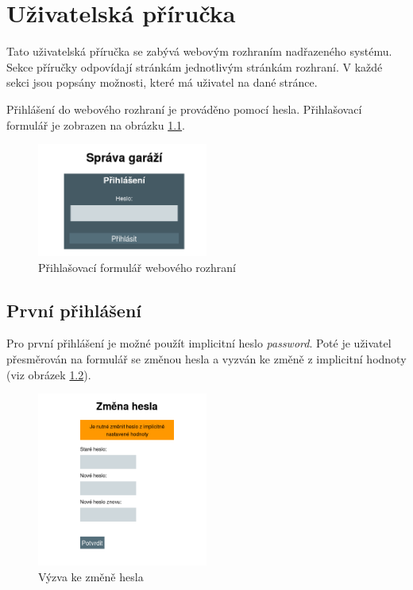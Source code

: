 \chapter{Uživatelská příručka}
\label{sec:guide}

Tato uživatelská příručka se zabývá webovým rozhraním nadřazeného systému. Sekce příručky odpovídají stránkám jednotlivým stránkám rozhraní. V každé sekci jsou popsány možnosti, které má uživatel na dané stránce.

Přihlášení do webového rozhraní je prováděno pomocí hesla. Přihlašovací formulář je zobrazen na obrázku \ref{fig:login}.

\begin{figure}[h!]
    \centering
    \includegraphics[width=0.5\textwidth]{images/login.png}
    \caption[Přihlašovací formulář webového rozhraní]{Přihlašovací formulář webového rozhraní}
    \label{fig:login}
\end{figure}

\section{První přihlášení}

Pro první přihlášení je možné použít implicitní heslo \textit{password}. Poté je uživatel přesměrován na formulář se změnou hesla a vyzván ke změně z implicitní hodnoty (viz obrázek \ref{fig:password_change}).

\begin{figure}[h!]
    \centering
    \includegraphics[width=0.5\textwidth]{images/pwd_change.png}
    \caption[Výzva ke změně hesla]{Výzva ke změně hesla}
    \label{fig:password_change}
\end{figure}


